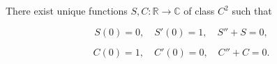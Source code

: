 There exist unique functions $S, C: \mathbb{R} \to \mathbb{C}$ of class $C^2$ such that

$$
S(0) = 0, \quad S'(0) = 1, \quad S'' + S = 0,
$$

$$
C(0) = 1, \quad C'(0) = 0, \quad C'' + C = 0.
$$
